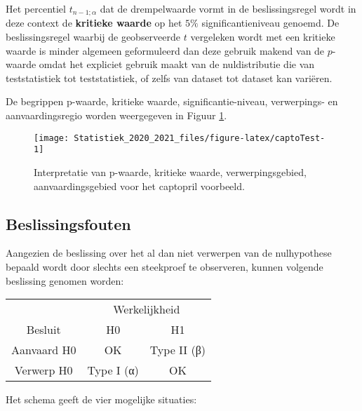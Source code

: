 \documentclass[
  12pt,dutch,coursenotes]{book}
\theoremstyle{definition}
\theoremstyle{definition}
\theoremstyle{definition}
\theoremstyle{remark}
\begin{document}
Het percentiel \(t_{n-1;\alpha}\) dat de drempelwaarde vormt in de beslissingsregel wordt in deze context de \textbf{kritieke waarde} op het \(5\%\) significantieniveau genoemd.
De beslissingsregel waarbij de geobserveerde \(t\) vergeleken wordt met een kritieke waarde is minder algemeen geformuleerd dan deze gebruik makend van de \(p\)-waarde omdat het expliciet gebruik maakt van de nuldistributie die van teststatistiek tot teststatistiek, of zelfs van dataset tot dataset kan variëren.

De begrippen p-waarde, kritieke waarde, significantie-niveau, verwerpings- en aanvaardingsregio worden weergegeven in Figuur \ref{fig:captoTest}.

\begin{figure}

{\centering \texttt{[image: Statistiek\_2020\_2021\_files/figure-latex/captoTest-1]} 

}

\caption{Interpretatie van p-waarde, kritieke waarde, verwerpingsgebied, aanvaardingsgebied voor het captopril voorbeeld.}\label{fig:captoTest}
\end{figure}

\hypertarget{beslissingsfouten}{%
\subsection{Beslissingsfouten}\label{beslissingsfouten}}

Aangezien de beslissing over het al dan niet verwerpen van de nulhypothese bepaald wordt door slechts een steekproef te observeren, kunnen volgende beslissing genomen worden:

\begin{table}[H]
\centering
\begin{tabular}{c|c|c}
\hline
\multicolumn{1}{c|}{ } & \multicolumn{2}{c}{Werkelijkheid} \\
\cline{2-3}
Besluit & H0 & H1\\
\hline
Aanvaard H0 & OK & Type II (β)\\
\hline
Verwerp H0 & Type I (α) & OK\\
\hline
\end{tabular}
\end{table}

Het schema geeft de vier mogelijke situaties:
\end{document}
